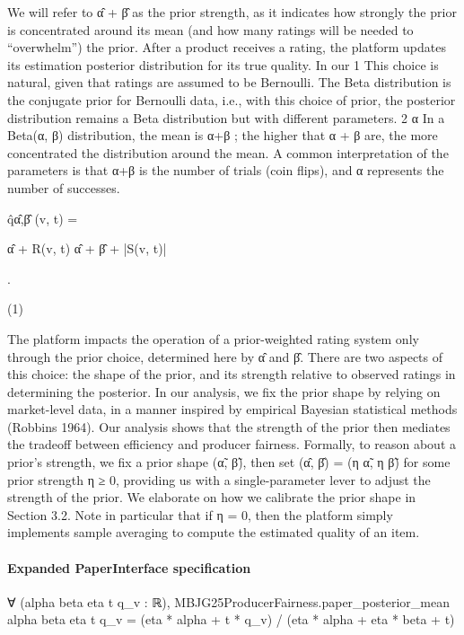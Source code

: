 \documentclass[10pt]{article}
\begin{document}
\begin{ReviewVerbatim}
We will refer to α̂ + β̂ as the prior strength, as it indicates
how strongly the prior is concentrated around its mean (and
how many ratings will be needed to “overwhelm”) the prior.
After a product receives a rating, the platform updates its
estimation posterior distribution for its true quality. In our
1
This choice is natural, given that ratings are assumed to be
Bernoulli. The Beta distribution is the conjugate prior for Bernoulli
data, i.e., with this choice of prior, the posterior distribution remains a Beta distribution but with different parameters.
2
α
In a Beta(α, β) distribution, the mean is α+β
; the higher that
α + β are, the more concentrated the distribution around the mean.
A common interpretation of the parameters is that α+β is the number of trials (coin flips), and α represents the number of successes.

q̂α̂,β̂ (v, t) =

α̂ + R(v, t)
α̂ + β̂ + |S(v, t)|

.

(1)

The platform impacts the operation of a prior-weighted
rating system only through the prior choice, determined here
by α̂ and β̂. There are two aspects of this choice: the shape
of the prior, and its strength relative to observed ratings in
determining the posterior. In our analysis, we fix the prior
shape by relying on market-level data, in a manner inspired
by empirical Bayesian statistical methods (Robbins 1964).
Our analysis shows that the strength of the prior then mediates the tradeoff between efficiency and producer fairness.
Formally, to reason about a prior’s strength, we fix a prior
shape (α̃, β̃), then set (α̂, β̂) = (η α̃, η β̃) for some prior
strength η ≥ 0, providing us with a single-parameter lever
to adjust the strength of the prior. We elaborate on how we
calibrate the prior shape in Section 3.2. Note in particular
that if η = 0, then the platform simply implements sample
averaging to compute the estimated quality of an item.
\end{ReviewVerbatim}


\paragraph{Expanded PaperInterface specification}
\begin{ReviewVerbatim}
∀ (alpha beta eta t q_v : ℝ),
  MBJG25ProducerFairness.paper_posterior_mean alpha beta eta t q_v =
    (eta * alpha + t * q_v) / (eta * alpha + eta * beta + t)
\end{ReviewVerbatim}
\end{document}
